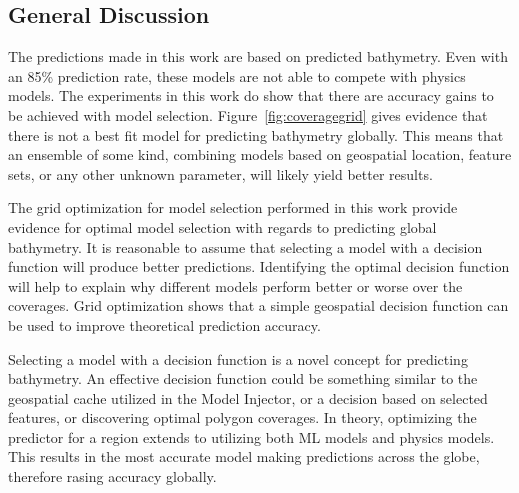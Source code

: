 
\subsection{General Discussion}
The predictions made in this work are based on predicted bathymetry.
Even with an 85\% prediction rate, these models are not able to compete with physics models.
The experiments in this work do show that there are accuracy gains to be achieved with model selection.
Figure~\ref{fig:coveragegrid} gives evidence that there is not a best fit model for predicting bathymetry globally.
This means that an ensemble of some kind, combining models based on geospatial location, feature sets, or any other unknown parameter, will likely yield better results.

The grid optimization for model selection performed in this work provide evidence for optimal model selection with regards to predicting global bathymetry.
It is reasonable to assume that selecting a model with a decision function will produce better predictions.
Identifying the optimal decision function will help to explain why different models perform better or worse over the coverages.
Grid optimization shows that a simple geospatial decision function can be used to improve theoretical prediction accuracy.

Selecting a model with a decision function is a novel concept for predicting bathymetry.
An effective decision function could be something similar to the geospatial cache utilized in the Model Injector, or a decision based on selected features, or discovering optimal polygon coverages.
In theory, optimizing the predictor for a region extends to utilizing both \ac{ML} models and physics models.
This results in the most accurate model making predictions across the globe, therefore rasing accuracy globally.
